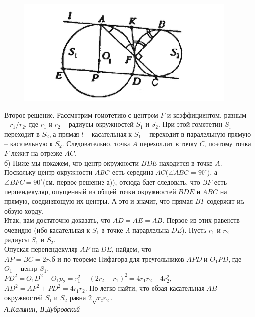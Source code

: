 \documentclass[russian,10pt,a4paper,twocolumn]{article}
\begin{document}
	
\begin{figure}[h]
	\centering
	\includegraphics[width=1\linewidth]{1}
\end{figure}
	
	\noindent
	Второе решение. Рассмотрим гомотетию с центром $F$ и коэффициентом, равным $-r_1/r_2$, где $r_1$ и $r_2$ -- радиусы окружностей $S_1$ и $S_2$. При этой гомотетин $S_1$ переходит в $S_2$, а прямая $l$ -- касательная к $S_1$ -- переходит в паралельную прямую -- касательную к $S_2$. Следовательно, точка $A$ перехолдит в точку $C$, поэтому точка $F$ лежит на отрезке $AC$.\\
	б) Ниже мы покажем, что центр окружности $BDE$ находится в точке $A$. Поскольку центр окружности $ABC$ есть середина $AC$($\angle ABC=90^{\circ}$), а $\angle BFC = 90^{\circ}$(см. первое решение а)), отсюда бдет следовать, что $BF$ есть перпендекуляр, опущенный из общей точки окружностей $BDE$ и $ABC$ на прямую, соединяющую их центры. А это и значит, что прямая $BF$ содержит иъ обзую хорду.\\
	Итак, нам достаточно доказать, что $AD=AE=AB$. Первое из этих равенств очевидно (ибо касательная к $S_1$ в точке $A$ парарлельна $DE$). Пусть $r_1$ и $r_2$ - радиусы $S_1$ и $S_2$.\\ Опуская перепендекуляр $AP$ на $DE$, найдем, что\\ $AP=BC=2r_2$б и по теореме Пифагора для треугольников $APD$ и $O_1PD$, где $O_1$ -- центр $S_1$,\\
	$PD^2 = O_1D^2 - O_1p_2 = r_1^2 - (2r_2-r_1)^2=4r_1r_2-4r_2^2$,\\
	$AD^2 = AP^2 +PD^2 = 4r_1r_2$. Но легко найти, что обзая касательная $AB$ окружностей $S_1$ и $S_2$ равна $2\sqrt{r_2r_2}$.\\
	{\slshape А.Калинин, В.Дубровский} \\
	
\end{document}
